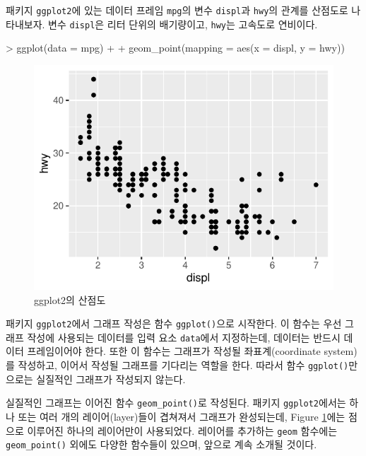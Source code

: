 \documentclass[
]{book}
\newenvironment{Shaded}{\begin{snugshade}}{\end{snugshade}}
\newcommand{\AttributeTok}[1]{\textcolor[rgb]{0.77,0.63,0.00}{#1}}
\newcommand{\FunctionTok}[1]{\textcolor[rgb]{0.00,0.00,0.00}{#1}}
\newcommand{\NormalTok}[1]{#1}
\newcommand{\SpecialCharTok}[1]{\textcolor[rgb]{0.00,0.00,0.00}{#1}}
\begin{document}
패키지 \texttt{ggplot2}에 있는 데이터 프레임 \texttt{mpg}의 변수 \texttt{displ}과 \texttt{hwy}의 관계를 산점도로 나타내보자.
변수 \texttt{displ}은 리터 단위의 배기량이고, \texttt{hwy}는 고속도로 연비이다.

\begin{Shaded}
\begin{Highlighting}[]
\SpecialCharTok{\textgreater{}} \FunctionTok{ggplot}\NormalTok{(}\AttributeTok{data =}\NormalTok{ mpg) }\SpecialCharTok{+}
\SpecialCharTok{+}   \FunctionTok{geom\_point}\NormalTok{(}\AttributeTok{mapping =} \FunctionTok{aes}\NormalTok{(}\AttributeTok{x =}\NormalTok{ displ, }\AttributeTok{y =}\NormalTok{ hwy))}
\end{Highlighting}
\end{Shaded}

\begin{figure}
\centering
\includegraphics{_main_files/figure-latex/first-plot-1.pdf}
\caption{\label{fig:first-plot}ggplot2의 산점도}
\end{figure}

패키지 \texttt{ggplot2}에서 그래프 작성은 함수 \texttt{ggplot()}으로 시작한다.
이 함수는 우선 그래프 작성에 사용되는 데이터를 입력 요소 \texttt{data}에서 지정하는데,
데이터는 반드시 데이터 프레임이어야 한다. 또한 이 함수는 그래프가 작성될 좌표계(coordinate system)를 작성하고,
이어서 작성될 그래프를 기다리는 역할을 한다. 따라서 함수 \texttt{ggplot()}만으로는 실질적인
그래프가 작성되지 않는다.

실질적인 그래프는 이어진 함수 \texttt{geom\_point()}로 작성된다. 패키지 \texttt{ggplot2}에서는 하나
또는 여러 개의 레이어(layer)들이 겹쳐져서 그래프가 완성되는데, Figure \ref{fig:first-plot}에는 점으로
이루어진 하나의 레이어만이 사용되었다. 레이어를 추가하는 \texttt{geom} 함수에는 \texttt{geom\_point()}
외에도 다양한 함수들이 있으며, 앞으로 계속 소개될 것이다.
\end{document}
